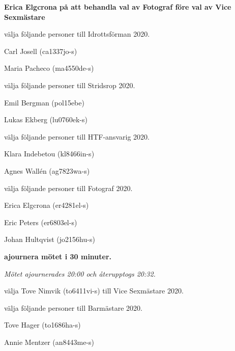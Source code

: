 \documentclass[10pt]{article}
\begin{document}
\begin{paragrafer}
\begin{paralist}
    \textbf{Erica Elgcrona \ypa på att behandla val av Fotograf före val av Vice Sexmästare}

    \textbf{\Mbaby}

    \Mba välja följande personer till Idrottsförman 2020.
    \begin{tightdashlist}
        \item Carl Josell (ca1337jo-s)
        \item Maria Pacheco (ma4550de-s)
    \end{tightdashlist}

    \Mba välja följande personer till Stridsrop 2020.
    \begin{tightdashlist}
        \item Emil Bergman (pol15ebe)
        \item Lukas Ekberg (lu0760ek-s)
    \end{tightdashlist}



    \Mba välja följande personer till HTF-ansvarig 2020.
    \begin{tightdashlist}
        \item Klara Indebetou (kl8466in-s)
        \item Agnes Wallén (ag7823wa-s)
    \end{tightdashlist}


    \Mba välja följande personer till Fotograf 2020.
    \begin{tightdashlist}
        \item Erica Elgcrona (er4281el-s)
        \item Eric Peters (er6803el-s)
        \item Johan Hultqvist (jo2156hu-s)
    \end{tightdashlist}

    \textbf{\Mba ajournera mötet i 30 minuter.}

    \emph{Mötet ajournerades 20:00 och återupptogs 20:32.}

    \Mba välja Tove Nimvik (to6411vi-s) till Vice Sexmästare 2020.

    \Mba välja följande personer till Barmästare 2020.
    \begin{tightdashlist}
        \item Tove Hager (to1686ha-s)
        \item Annie Mentzer (an8443me-s)
    \end{tightdashlist}


\end{paralist}
\end{paragrafer}
\end{document}
